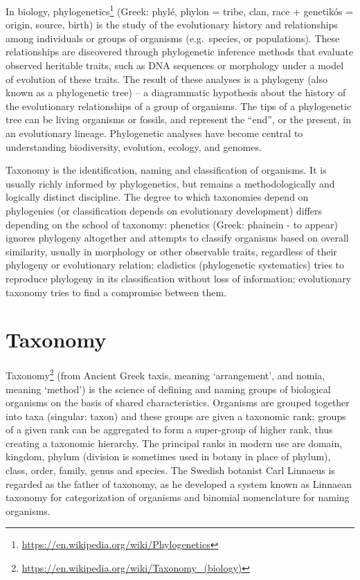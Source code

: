 \documentclass[]{book}
\let\rmarkdownfootnote\footnote%
\def\footnote{\protect\rmarkdownfootnote}
\renewcommand{\href}[2]{#2\footnote{\url{#1}}}
\theoremstyle{definition}
\theoremstyle{definition}
\theoremstyle{definition}
\theoremstyle{remark}
\begin{document}
\begin{enumerate}
In biology,
\href{https://en.wikipedia.org/wiki/Phylogenetics}{phylogenetics}
(Greek: phylé, phylon = tribe, clan, race + genetikós = origin, source,
birth) is the study of the evolutionary history and relationships among
individuals or groups of organisms (e.g.~species, or populations). These
relationships are discovered through phylogenetic inference methods that
evaluate observed heritable traits, such as DNA sequences or morphology
under a model of evolution of these traits. The result of these analyses
is a phylogeny (also known as a phylogenetic tree) -- a diagrammatic
hypothesis about the history of the evolutionary relationships of a
group of organisms. The tips of a phylogenetic tree can be living
organisms or fossils, and represent the ``end'', or the present, in an
evolutionary lineage. Phylogenetic analyses have become central to
understanding biodiversity, evolution, ecology, and genomes.

Taxonomy is the identification, naming and classification of organisms.
It is usually richly informed by phylogenetics, but remains a
methodologically and logically distinct discipline. The degree to which
taxonomies depend on phylogenies (or classification depends on
evolutionary development) differs depending on the school of taxonomy:
phenetics (Greek: phainein - to appear) ignores phylogeny altogether and
attempts to classify organisms based on overall similarity, usually in
morphology or other observable traits, regardless of their phylogeny or
evolutionary relation; cladistics (phylogenetic systematics) tries to
reproduce phylogeny in its classification without loss of information;
evolutionary taxonomy tries to find a compromise between them.  

\section{Taxonomy}\label{taxonomy}

\href{https://en.wikipedia.org/wiki/Taxonomy_(biology)}{Taxonomy} (from
Ancient Greek taxis, meaning `arrangement', and nomia, meaning `method')
is the science of defining and naming groups of biological organisms on
the basis of shared characteristics. Organisms are grouped together into
taxa (singular: taxon) and these groups are given a taxonomic rank;
groups of a given rank can be aggregated to form a super-group of higher
rank, thus creating a taxonomic hierarchy. The principal ranks in modern
use are domain, kingdom, phylum (division is sometimes used in botany in
place of phylum), class, order, family, genus and species. The Swedish
botanist Carl Linnaeus is regarded as the father of taxonomy, as he
developed a system known as Linnaean taxonomy for categorization of
organisms and binomial nomenclature for naming organisms.


\end{enumerate}
\end{document}
